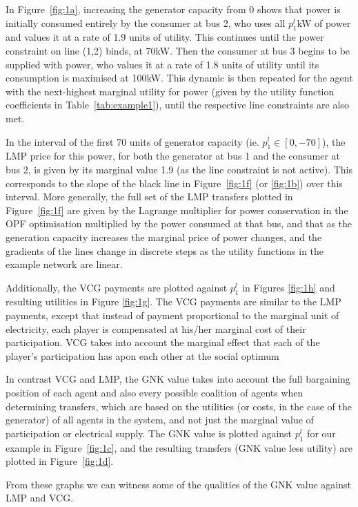In Figure~\ref{fig:1a}, increasing the generator capacity from $0$ shows that power is initially consumed entirely by the consumer at bus 2, 
who uses all $p_1^l$kW of power and values it at a rate of 1.9 units of utility. This continues until the power constraint on line (1,2) binds, at 70kW.
Then the consumer at bus 3 begins to be supplied with power, who values it at a rate of 1.8 units of utility until its consumption is maximised at 100kW. 
This dynamic is then repeated for the agent with the next-highest marginal utility for power (given by the utility function coefficients in Table~\ref{tab:example1}), until the respective line constraints are also met.

In the interval of the first 70 units of generator capacity (ie. $p_1^l \in [0,-70]$), the LMP price for this power, for both the generator at bus 1 and the consumer at bus 2, is given by its marginal value 1.9 (as the line constraint is not active). This corresponds to the slope of the black line in Figure~\ref{fig:1f} (or \ref{fig:1b}) over this interval. 
More generally, the full set of the LMP transfers plotted in Figure~\ref{fig:1f} are given by the Lagrange multiplier for power conservation in the OPF optimisation multiplied by the power consumed at that bus, and that as the generation capacity increases the marginal price of power changes, and the gradients of the lines change in discrete steps as the utility functions in the example network are linear.

Additionally, the VCG payments are plotted against $p_1^l$ in Figures \ref{fig:1h} and resulting utilities in Figure \ref{fig:1g}.
The VCG payments are similar to the LMP payments, except that instead of payment proportional to the marginal unit of electricity, each player is compensated at his/her marginal cost of their participation.
VCG takes into account the marginal effect that each of the player's participation has apon each other at the social optimum

In contrast VCG and LMP, the GNK value takes into account the full bargaining position of each agent and also every possible coalition of agents when determining transfers, which are based on the utilities (or costs, in the case of the generator) of all agents in the system, and not just the marginal value of participation or electrical supply.
The GNK value is plotted against $p_1^l$ for our example in Figure~\ref{fig:1c}, and the resulting transfers (GNK value less utility) are plotted in Figure~\ref{fig:1d}.

From these graphs we can witness some of the qualities of the GNK value against LMP and VCG.

